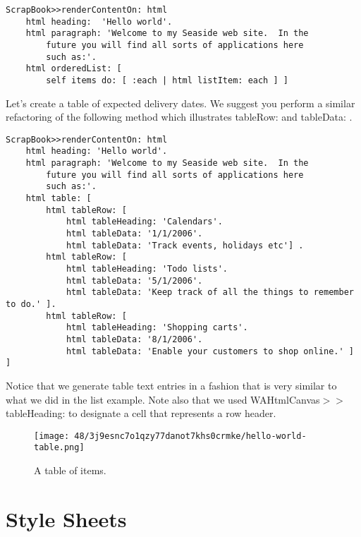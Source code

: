 \documentclass[a4paper,10pt,twoside]{book}
\newcommand{\ct}[1]{{\small\ttfamily\textup{#1}}}
\begin{document}
\begin{lstlisting}
ScrapBook>>renderContentOn: html
    html heading:  'Hello world'.
    html paragraph: 'Welcome to my Seaside web site.  In the
        future you will find all sorts of applications here
        such as:'.
    html orderedList: [
        self items do: [ :each | html listItem: each ] ]
\end{lstlisting}

Let's create a table of expected delivery dates.  We suggest you perform a similar refactoring of the following method which illustrates \ct{tableRow:} and \ct{tableData:} .

\begin{lstlisting}
ScrapBook>>renderContentOn: html
    html heading: 'Hello world'.
    html paragraph: 'Welcome to my Seaside web site.  In the
        future you will find all sorts of applications here
        such as:'.
    html table: [
        html tableRow: [
            html tableHeading: 'Calendars'.
            html tableData: '1/1/2006'.
            html tableData: 'Track events, holidays etc'] .
        html tableRow: [
            html tableHeading: 'Todo lists'.
            html tableData: '5/1/2006'.
            html tableData: 'Keep track of all the things to remember to do.' ].
        html tableRow: [
            html tableHeading: 'Shopping carts'.
            html tableData: '8/1/2006'.
            html tableData: 'Enable your customers to shop online.' ] ]
\end{lstlisting}

Notice that we generate table text entries in a fashion that is very similar to what we did in the list example. Note also that we used  \ct{WAHtmlCanvas$>$$>$tableHeading:} to designate a cell that represents a row header. 

\begin{figure}[h!tbp]
	\begin{center}
		\texttt{[image: 48/3j9esnc7o1qzy77danot7khs0crmke/hello-world-table.png]}
		\caption{A table of items.\label{book:fundamentals:renderingcomponents:listsandtables:helloworldtable}}
	\end{center}
\end{figure}


\section{Style Sheets}
\label{book:fundamentals:renderingcomponents:stylesheets}
\end{document}
